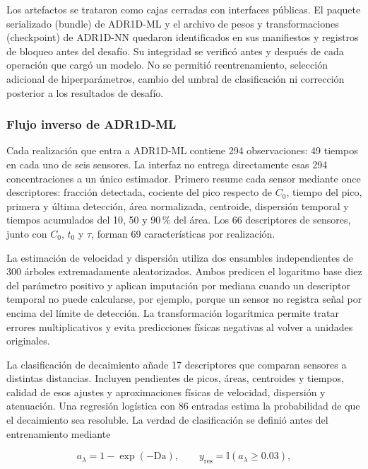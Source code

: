 \documentclass[11pt,a4paper]{article}
\begin{document}
Los artefactos se trataron como cajas cerradas con interfaces públicas. El
paquete serializado (bundle) de ADR1D-ML y el archivo de pesos y
transformaciones (checkpoint) de ADR1D-NN quedaron identificados en sus
manifiestos y registros de bloqueo antes del desafío. Su integridad se verificó
antes y después de cada operación que cargó un modelo. No se permitió
reentrenamiento, selección adicional de
hiperparámetros, cambio del umbral de clasificación ni corrección posterior a
los resultados de desafío.

\subsubsection{Flujo inverso de ADR1D-ML}

Cada realización que entra a ADR1D-ML contiene 294 observaciones: 49 tiempos en
cada uno de seis sensores. La interfaz no entrega directamente esas 294
concentraciones a un único estimador. Primero resume cada sensor mediante once
descriptores: fracción detectada, cociente del pico respecto de $C_0$, tiempo
del pico, primera y última detección, área normalizada, centroide, dispersión
temporal y tiempos acumulados del 10, 50 y 90\,\% del área. Los 66 descriptores
de sensores, junto con $C_0$, $t_0$ y $\tau$, forman 69 características por
realización.

La estimación de velocidad y dispersión utiliza dos ensambles independientes
de 300 árboles extremadamente aleatorizados. Ambos predicen el logaritmo base
diez del parámetro positivo y aplican imputación por mediana cuando un
descriptor temporal no puede calcularse, por ejemplo, porque un sensor no
registra señal por encima del límite de detección. La transformación logarítmica
permite tratar errores multiplicativos y evita predicciones físicas negativas
al volver a unidades originales.

La clasificación de decaimiento añade 17 descriptores que comparan sensores a
distintas distancias. Incluyen pendientes de picos, áreas, centroides y tiempos,
calidad de esos ajustes y aproximaciones físicas de velocidad, dispersión y
atenuación. Una regresión logística con 86 entradas estima la probabilidad de
que el decaimiento sea resoluble. La verdad de clasificación se definió antes
del entrenamiento mediante

\begin{equation}
a_{\lambda}=1-\exp(-\mathrm{Da}), \qquad
y_{\mathrm{res}}=\mathbb{I}\!\left(a_{\lambda}\geq0.03\right),
\label{eq:resolvability}
\end{equation}
\end{document}
